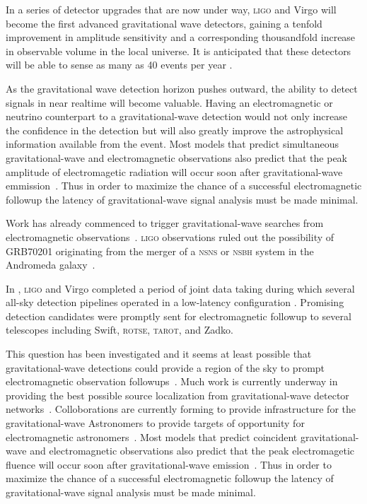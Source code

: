 In a series of detector upgrades that are now under way, \textsc{ligo} and Virgo will become the first advanced gravitational wave detectors, gaining a tenfold improvement in amplitude sensitivity \citeneeded{} and a corresponding thousandfold increase in observable volume in the local universe.  It is anticipated that these detectors will be able to sense as many as 40 events per year \cite{Abadie:2010p10836}.

As the gravitational wave detection horizon pushes outward, the ability to detect signals in near realtime will become valuable.  Having an electromagnetic or neutrino counterpart to a 
gravitational-wave detection would not only increase the confidence in 
the detection but will also greatly improve the astrophysical information
available from the event.  Most models that predict simultaneous
gravitational-wave and electromagnetic observations also predict that the
peak amplitude of electromagetic radiation will occur soon after 
gravitational-wave emmission~\cite{sylvestre2003}.  Thus in order to maximize
the chance of a successful electromagnetic followup the latency of 
gravitational-wave signal analysis must be made minimal.

 Work has already commenced to trigger gravitational-wave searches from 
electromagnetic observations~\cite{triggeredsearches2008}. \textsc{ligo} observations
ruled out the possibility of GRB70201 originating from the merger of a
\textsc{nsns} or \textsc{nsbh} system in the Andromeda galaxy~\cite{GRB070201}.

In , \textsc{ligo} and Virgo completed a period of joint data taking during which several all-sky detection pipelines operated in a low-latency configuration \citeneeded.  Promising detection candidates were promptly sent for electromagnetic followup \citeneeded{} to several telescopes including Swift, \textsc{rotse}, \textsc{tarot}, and Zadko.


This question has been investigated and it seems  at least
possible that gravitational-wave detections could provide a region of the
sky to prompt electromagnetic observation followups~\cite{sylvestre2003}.
 Much work is currently underway in providing the best possible source 
localization from gravitational-wave detector networks~\cite{markowitz2008, raymond2008, cavalier2006}.  Colloborations are currently forming to provide infrastructure for the gravitational-wave
Astronomers to provide targets of opportunity for electromagnetic 
astronomers~\cite{kanner2008}.  Most models that predict coincident
gravitational-wave and electromagnetic observations also predict that the
peak electromagetic fluence will occur soon after 
gravitational-wave emission~\cite{sylvestre2003}.  Thus in order to maximize
the chance of a successful electromagnetic followup the latency of 
gravitational-wave signal analysis must be made minimal.

